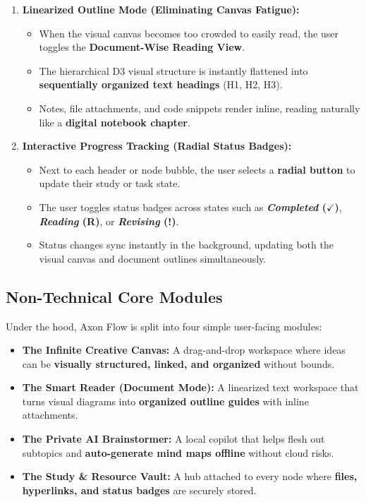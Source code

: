 \documentclass[12pt, a4paper]{article}
\begin{document}
\begin{enumerate}[leftmargin=*, label=\textbf{\alph*)}]
  \item \textbf{Linearized Outline Mode (Eliminating Canvas Fatigue):}
    \begin{itemize}[label=\small$\bullet$, leftmargin=15pt]
      \item When the visual canvas becomes too crowded to easily read, the user toggles the \textbf{Document-Wise Reading View}.
      \item The hierarchical D3 visual structure is instantly flattened into \textbf{sequentially organized text headings} (H1, H2, H3).
      \item Notes, file attachments, and code snippets render inline, reading naturally like a \textbf{digital notebook chapter}.
    \end{itemize}

  \item \textbf{Interactive Progress Tracking (Radial Status Badges):}
    \begin{itemize}[label=\small$\bullet$, leftmargin=15pt]
      \item Next to each header or node bubble, the user selects a \textbf{radial button} to update their study or task state.
      \item The user toggles status badges across states such as \textbf{\textit{Completed} ($\checkmark$)}, \textbf{\textit{Reading} (R)}, or \textbf{\textit{Revising} (!)}.
      \item Status changes sync instantly in the background, updating both the visual canvas and document outlines simultaneously.
    \end{itemize}
\end{enumerate}

\subsection{Non-Technical Core Modules}
Under the hood, Axon Flow is split into four simple user-facing modules:
\begin{itemize}[leftmargin=*]
  \item[\textcolor{axonpurple}{\tiny$\blacksquare$}] \textbf{The Infinite Creative Canvas:} A drag-and-drop workspace where ideas can be \textbf{visually structured, linked, and organized} without bounds.
  \item[\textcolor{axonpurple}{\tiny$\blacksquare$}] \textbf{The Smart Reader (Document Mode):} A linearized text workspace that turns visual diagrams into \textbf{organized outline guides} with inline attachments.
  \item[\textcolor{axonpurple}{\tiny$\blacksquare$}] \textbf{The Private AI Brainstormer:} A local copilot that helps flesh out subtopics and \textbf{auto-generate mind maps offline} without cloud risks.
  \item[\textcolor{axonpurple}{\tiny$\blacksquare$}] \textbf{The Study \& Resource Vault:} A hub attached to every node where \textbf{files, hyperlinks, and status badges} are securely stored.
\end{itemize}
\end{document}
